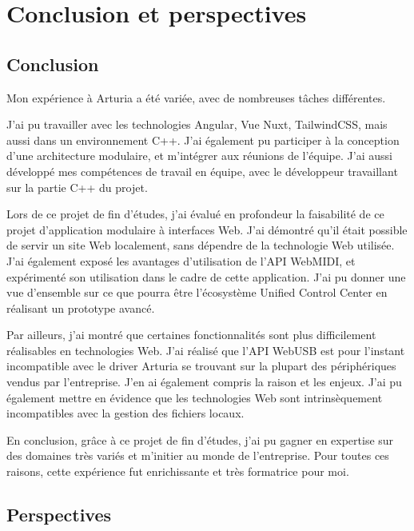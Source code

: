 \documentclass[francais]{rapportPFE}  %
\begin{document}
\section{Conclusion et perspectives}
\subsection{Conclusion}

Mon expérience à Arturia a été variée, avec de nombreuses tâches différentes.

J'ai pu travailler avec les technologies Angular, Vue Nuxt, TailwindCSS, mais aussi dans un environnement C++. J'ai également pu participer à la conception d'une architecture modulaire, et m'intégrer aux réunions de l'équipe. J'ai aussi développé mes compétences de travail en équipe, avec le développeur travaillant sur la partie C++ du projet.

Lors de ce projet de fin d'études, j'ai évalué en profondeur la faisabilité de ce projet d'application modulaire à interfaces Web. J'ai démontré qu'il était possible de servir un site Web localement, sans dépendre de la technologie Web utilisée. J'ai également exposé les avantages d'utilisation de l'API WebMIDI, et expérimenté son utilisation dans le cadre de cette application. J'ai pu donner une vue d'ensemble sur ce que pourra être l'écosystème Unified Control Center en réalisant un prototype avancé. 

Par ailleurs, j'ai montré que certaines fonctionnalités sont plus difficilement réalisables en technologies Web. J'ai réalisé que l'API WebUSB est pour l'instant incompatible avec le driver Arturia se trouvant sur la plupart des périphériques vendus par l'entreprise. J'en ai également compris la raison et les enjeux. J'ai pu également mettre en évidence que les technologies Web sont intrinsèquement incompatibles avec la gestion des fichiers locaux.

En conclusion, grâce à ce projet de fin d'études, j'ai pu gagner en expertise sur des domaines très variés et m'initier au monde de l'entreprise. Pour toutes ces raisons, cette expérience fut enrichissante et très formatrice pour moi.

\subsection{Perspectives}
\end{document}
